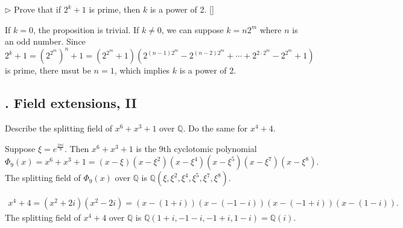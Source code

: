 \begin{problem}[3.15]
$\triangleright$ Prove that if $2^k+1$ is prime, then $k$ is a power of 2. []
\end{problem}
\begin{solution}
If $k=0$, the proposition is trivial. If $k\ne0$, we can suppose $k=n2^m$ where $n$ is an odd number. Since
\[
	2^k+1=\left(2^{2^m}\right)^n+1=\left(2^{2^m}+1\right)\left(2^{(n-1)2^m}-2^{(n-2)2^m}+\cdots+2^{2\cdot 2^m}-2^{ 2^m}+1\right)
\]
is prime, there msut be $n=1$, which implies $k$ is a power of 2.
\end{solution}
\subsection{. Field extensions, II}
\begin{problem}[4.2]
Describe the splitting field of $x^6+x^3+1$ over $\mathbb{Q}$. Do the same for $x^4+4$.
\end{problem}
\begin{solution}
Suppose $\xi=e^{\frac{2\pi i}{9}}$. Then $x^6+x^3+1$ is the 9th cyclotomic polynomial
\[
	\Phi_9(x)=x^6+x^3+1=\left(x-\xi\right)\left(x-\xi^2\right)\left(x-\xi^4\right)\left(x-\xi^5\right)\left(x-\xi^7\right)\left(x-\xi^8\right).
\]
The splitting field of $\Phi_9(x)$ over $\mathbb{Q}$ is $\mathbb{Q}(\xi,\xi^2,\xi^4,\xi^5,\xi^7,\xi^8)$. 

\begin{align*}
	x^4+4=(x^2+2i)(x^2-2i)=(x-(1+i))(x-(-1-i))(x-(-1+i))(x-(1-i)).
\end{align*}
The splitting field of $x^4+4$ over $\mathbb{Q}$ is $\mathbb{Q}(1+i,-1-i,-1+i,1-i)=\mathbb{Q}(i)$.
\end{solution}

